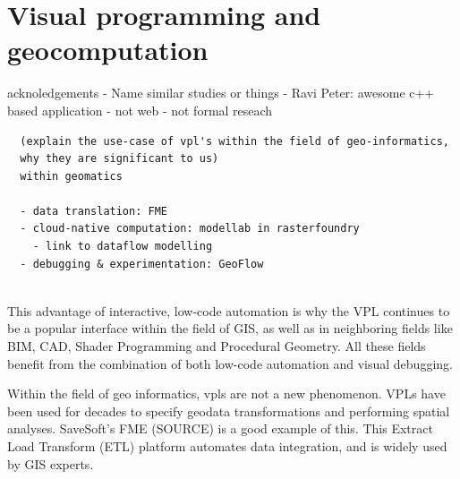 \section{Visual programming and geocomputation}
\label{sec:related-geovpl}

acknoledgements
- Name similar studies or things 
  - Ravi Peter: awesome c++ based application 
    - not web
    - not formal reseach

\begin{lstlisting}
  (explain the use-case of vpl's within the field of geo-informatics, 
  why they are significant to us) 
  within geomatics

  - data translation: FME 
  - cloud-native computation: modellab in rasterfoundry
    - link to dataflow modelling
  - debugging & experimentation: GeoFlow 
  
\end{lstlisting}


This advantage of interactive, low-code automation is why the VPL continues to be a popular interface within the field of GIS, as well as in neighboring fields like BIM, CAD, Shader Programming and Procedural Geometry. 
All these fields benefit from the combination of both low-code automation and visual debugging.

Within the field of geo informatics, \ac{vpl}s are not a new phenomenon. VPLs have been used for decades to specify geodata transformations and performing spatial analyses.  
SaveSoft's FME (SOURCE) is a good example of this. This Extract Load Transform (ETL) platform automates data integration, and is widely used by GIS experts.





